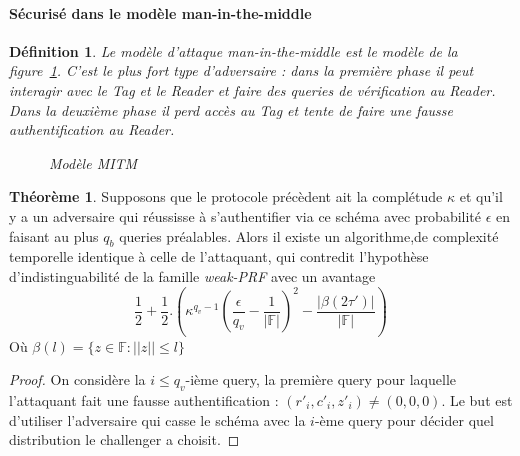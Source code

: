 \documentclass{article}		%
\newtheorem{defi}{Définition}
\theoremstyle{definition}
\newtheorem{theo}{Théorème}
\theoremstyle{plain}
\theoremstyle{plain}
\theoremstyle{plain}
\theoremstyle{plain}
\theoremstyle{plain}
\begin{document}
\paragraph{Sécurisé dans le modèle man-in-the-middle}
\begin{defi}
Le modèle d'attaque man-in-the-middle est le modèle de la
figure~\ref{mitm}.
C'est le plus fort type d'adversaire : dans la première phase il peut
interagir avec le Tag et le Reader et faire des queries de vérification
au Reader. Dans la deuxième phase il perd accès au Tag et tente de faire
une fausse authentification au Reader. 

\begin{figure}[h]
\centering
{}
\caption{Modèle MITM}
\label{mitm}
\end{figure}

\end{defi}
\begin{theo}
Supposons que le protocole précèdent ait la complétude $\kappa$ et qu'il y a un
adversaire qui réussisse à s'authentifier via ce schéma avec probabilité $\epsilon$
en faisant au plus $q_b$ queries préalables.
Alors il existe un algorithme,de complexité temporelle identique à
celle de l'attaquant, qui contredit l'hypothèse
d'indistinguabilité de la famille \emph{weak-PRF} avec un avantage
$$\frac{1}{2}+
\frac{1}{2}.(\kappa^{q_v-1}(\frac{\epsilon}{q_v}-\frac{1}{|\mathbb{F}|})^2-\frac{|\beta(2\tau')|}{|\mathbb{F}|})
$$
Où $\beta(l)=\{z\in \mathbb{F} : ||z|| \leq l\}$
\end{theo}
\begin{proof}

On considère  la $i\leq q_v$-ième query,  la première query pour laquelle
l'attaquant fait une fausse authentification :
$(r'_i,c'_i,z'_i)\not=(0,0,0)$. Le but est d'utiliser l'adversaire qui
casse le schéma avec la $i$-ème query pour décider quel distribution le
challenger a choisit. 

\end{proof}
\end{document}
